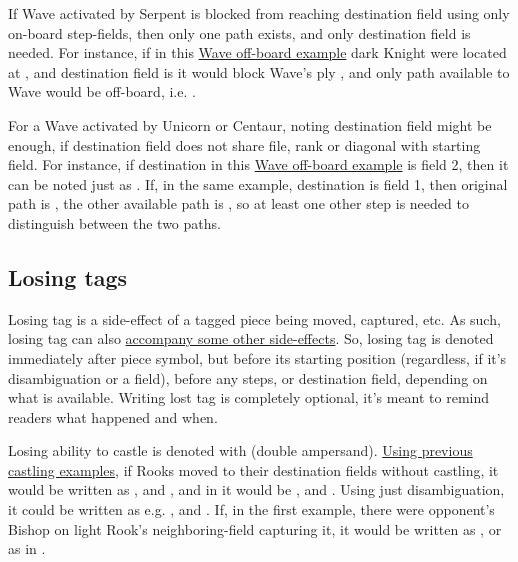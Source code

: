 If Wave activated by Serpent is blocked from reaching destination field using only on-board
step-fields, then only one path exists, and only destination field is needed. For instance,
if in this
\hyperref[fig:scn_tr_35_wave_out_of_board]{Wave off-board example} dark Knight were located at
, and destination field is  it would block Wave's ply ,
and only path available to Wave would be off-board, i.e. .

For a Wave activated by Unicorn or Centaur, noting destination field might be enough, if
destination field does not share file, rank or diagonal with starting field. For instance, if
destination in this \hyperref[fig:scn_mv_30_wave_off_board]{Wave off-board example} is field 2,
then it can be noted just as . If, in the same example, destination is field 1,
then original path is , the other available path is
, so at least one other step is needed to distinguish between the
two paths.

\subsection*{Losing tags}
\label{sec:Appendix/Notation/Losing tags}

Losing tag is a side-effect of a tagged piece being moved, captured, etc. As such,
losing tag can also
\hyperref[tbl:Appendix/Summary/Accompanying-losing-tags]{accompany some other side-effects}.
So, losing tag is denoted immediately after piece symbol, but before its starting
position (regardless, if it's disambiguation or a field), before any steps, or
destination field, depending on what is available. Writing lost tag is completely
optional, it's meant to remind readers what happened and when.

Losing ability to castle is denoted with \alg{\&\&} (double ampersand).
\hyperref[sec:Appendix/Notation/Castling]{Using previous castling examples}, if
Rooks moved to their destination fields without castling, it would be written as
, and , and in  it would be ,
and . Using just disambiguation, it could be written as e.g.
, and .\newline
\indent
If, in the first example, there were opponent's Bishop on light Rook's neighboring-field
capturing it, it would be written as , or as  in
.

